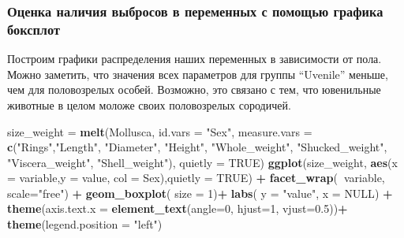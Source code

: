 \documentclass[]{article}
\newenvironment{Shaded}{\begin{snugshade}}{\end{snugshade}}
\newcommand{\DataTypeTok}[1]{\textcolor[rgb]{0.13,0.29,0.53}{#1}}
\newcommand{\DecValTok}[1]{\textcolor[rgb]{0.00,0.00,0.81}{#1}}
\newcommand{\FloatTok}[1]{\textcolor[rgb]{0.00,0.00,0.81}{#1}}
\newcommand{\KeywordTok}[1]{\textcolor[rgb]{0.13,0.29,0.53}{\textbf{#1}}}
\newcommand{\NormalTok}[1]{#1}
\newcommand{\OperatorTok}[1]{\textcolor[rgb]{0.81,0.36,0.00}{\textbf{#1}}}
\newcommand{\OtherTok}[1]{\textcolor[rgb]{0.56,0.35,0.01}{#1}}
\newcommand{\StringTok}[1]{\textcolor[rgb]{0.31,0.60,0.02}{#1}}
\begin{document}
\hypertarget{ux43eux446ux435ux43dux43aux430-ux43dux430ux43bux438ux447ux438ux44f-ux432ux44bux431ux440ux43eux441ux43eux432-ux432-ux43fux435ux440ux435ux43cux435ux43dux43dux44bux445-ux441-ux43fux43eux43cux43eux449ux44cux44e-ux433ux440ux430ux444ux438ux43aux430-ux431ux43eux43aux441ux43fux43bux43eux442}{%
\subsubsection{Оценка наличия выбросов в переменных с помощью графика
боксплот}\label{ux43eux446ux435ux43dux43aux430-ux43dux430ux43bux438ux447ux438ux44f-ux432ux44bux431ux440ux43eux441ux43eux432-ux432-ux43fux435ux440ux435ux43cux435ux43dux43dux44bux445-ux441-ux43fux43eux43cux43eux449ux44cux44e-ux433ux440ux430ux444ux438ux43aux430-ux431ux43eux43aux441ux43fux43bux43eux442}}

Построим графики распределения наших переменных в зависимости от пола.
Можно заметить, что значения всех параметров для группы ``Uvenile''
меньше, чем для половозрелых особей. Возможно, это связано с тем, что
ювенильные животные в целом моложе своих половозрелых сородичей.

\begin{Shaded}
\begin{Highlighting}[]
\NormalTok{size_weight =}\StringTok{ }\KeywordTok{melt}\NormalTok{(Mollusca, }\DataTypeTok{id.vars =} \StringTok{"Sex"}\NormalTok{, }\DataTypeTok{measure.vars =} \KeywordTok{c}\NormalTok{(}\StringTok{"Rings"}\NormalTok{,}\StringTok{"Length"}\NormalTok{, }\StringTok{"Diameter"}\NormalTok{, }\StringTok{"Height"}\NormalTok{, }\StringTok{"Whole_weight"}\NormalTok{, }\StringTok{"Shucked_weight"}\NormalTok{, }\StringTok{"Viscera_weight"}\NormalTok{, }\StringTok{"Shell_weight"}\NormalTok{), }\DataTypeTok{quietly =} \OtherTok{TRUE}\NormalTok{)}
\KeywordTok{ggplot}\NormalTok{(size_weight, }\KeywordTok{aes}\NormalTok{(}\DataTypeTok{x =}\NormalTok{ variable,}\DataTypeTok{y =}\NormalTok{ value, }\DataTypeTok{col =}\NormalTok{ Sex),}\DataTypeTok{quietly =} \OtherTok{TRUE}\NormalTok{) }\OperatorTok{+}\StringTok{ }\KeywordTok{facet_wrap}\NormalTok{(}\OperatorTok{~}\NormalTok{variable, }\DataTypeTok{scale=}\StringTok{"free"}\NormalTok{) }\OperatorTok{+}\StringTok{ }\KeywordTok{geom_boxplot}\NormalTok{( }\DataTypeTok{size =} \DecValTok{1}\NormalTok{)}\OperatorTok{+}\StringTok{ }\KeywordTok{labs}\NormalTok{( }\DataTypeTok{y =} \StringTok{"value"}\NormalTok{, }\DataTypeTok{x =} \OtherTok{NULL}\NormalTok{) }\OperatorTok{+}\StringTok{ }\KeywordTok{theme}\NormalTok{(}\DataTypeTok{axis.text.x =} \KeywordTok{element_text}\NormalTok{(}\DataTypeTok{angle=}\DecValTok{0}\NormalTok{, }\DataTypeTok{hjust=}\DecValTok{1}\NormalTok{, }\DataTypeTok{vjust=}\FloatTok{0.5}\NormalTok{))}\OperatorTok{+}\StringTok{ }\KeywordTok{theme}\NormalTok{(}\DataTypeTok{legend.position =} \StringTok{"left"}\NormalTok{)}
\end{Highlighting}
\end{Shaded}
\end{document}
